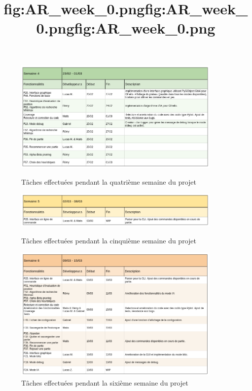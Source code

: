 \documentclass[a4paper,12pt]{article}
\begin{document}
\begin{figure}[h]
    \centering
    \includegraphics[width=0.9\textwidth]{images/AR_week_04.png}
    \caption{Tâches effectuées pendant la quatrième semaine du projet}
    \title{fig:AR_week_0.png}

    \vspace{1cm}

    \includegraphics[width=0.9\textwidth]{images/AR_week_05.png}
    \caption{Tâches effectuées pendant la cinquième semaine du projet}
    \title{fig:AR_week_0.png}

    \vspace{1cm}

    \includegraphics[width=0.9\textwidth]{images/AR_week_06.png}
    \caption{Tâches effectuées pendant la sixième semaine du projet}
    \title{fig:AR_week_0.png}
\end{figure}
\end{document}
